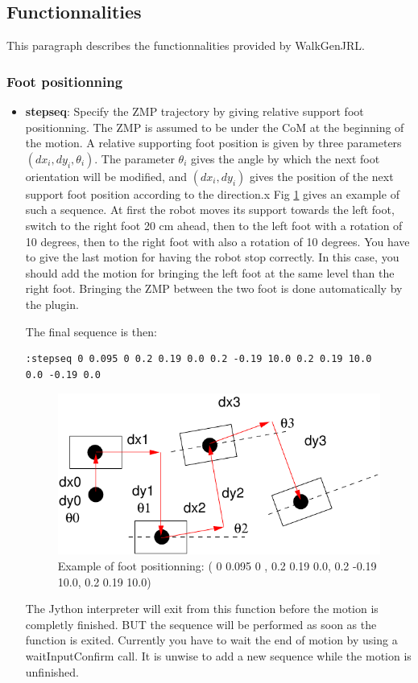 \subsection{Functionnalities}

This paragraph describes the functionnalities provided by WalkGenJRL.

\subsubsection{Foot positionning}

\begin{itemize}
\item {\bf stepseq}: Specify the ZMP trajectory by giving relative support foot positionning.
The ZMP is assumed to be under the CoM at the beginning of the motion.
A relative supporting foot position is given by three parameters $(dx_i,dy_i,\theta_i)$.
The parameter $\theta_i$ gives the angle by which the next foot orientation will be modified, and $(dx_i,dy_i)$ gives
the position of the next support foot position according to the direction.x
Fig \ref{pic:FootPositionning} gives an example of such a sequence.
At first the robot moves its support towards the left foot, switch to the right foot
20 cm ahead, then to the left foot with a rotation of 10 degrees, then to the right
foot with also a rotation of 10 degrees. You have to give the last motion for having 
the robot stop correctly. In this case, you should add the motion for bringing the left foot
at the same level than the right foot. Bringing the ZMP between the two foot is done 
automatically by the plugin. 

The final sequence is then:
\begin{verbatim}
:stepseq 0 0.095 0 0.2 0.19 0.0 0.2 -0.19 10.0 0.2 0.19 10.0 
0.0 -0.19 0.0 
\end{verbatim}
\begin{figure}[htb]
\begin{center}
\includegraphics{./figures/PatternGenerator/FootPositionning}
\caption{Example of foot positionning: ( 0 0.095 0 , 0.2 0.19 0.0, 0.2 -0.19 10.0, 0.2 0.19 10.0) }
\label{pic:FootPositionning}
\end{center}
\end{figure}
The Jython interpreter will exit from this function before the motion
is completly finished. BUT the sequence will be performed as soon as
the function is exited.
Currently you have to wait the end of motion
by using a waitInputConfirm call.
It is unwise to add a new sequence while the motion is unfinished.


\end{itemize}

